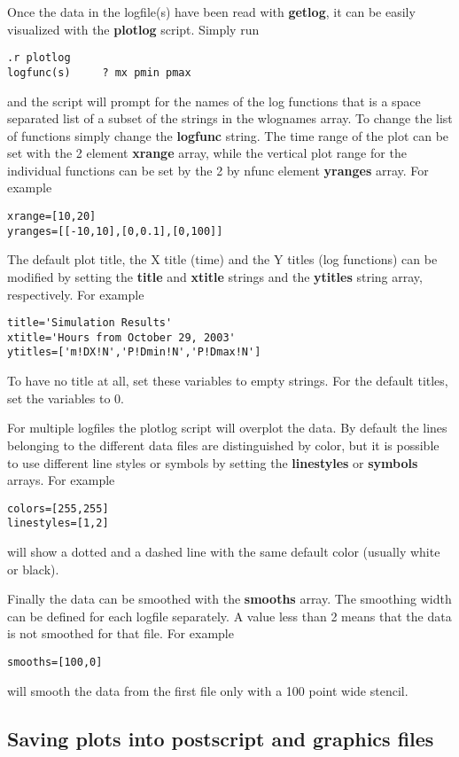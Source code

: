 Once the data in the logfile(s) have been read with {\bf getlog},
it can be easily visualized with the {\bf plotlog} script.
Simply run
\begin{verbatim}
.r plotlog
logfunc(s)     ? mx pmin pmax
\end{verbatim}
and the script will prompt for the names of the log functions that is
a space separated list of a subset of the strings in the wlognames array. 
To change the list of functions simply change the {\bf logfunc} string.
The time range of the plot can be set with the 2 element
{\bf xrange} array, while the vertical plot range for the individual functions 
can be set by the 2 by nfunc element {\bf yranges} array. For example
\begin{verbatim}
xrange=[10,20]
yranges=[[-10,10],[0,0.1],[0,100]]
\end{verbatim}
The default plot title, the X title (time) and the Y titles (log functions)
can be modified by setting the {\bf title} and {\bf xtitle} strings
and the {\bf ytitles} string array, respectively. For example
\begin{verbatim}
title='Simulation Results'
xtitle='Hours from October 29, 2003'
ytitles=['m!DX!N','P!Dmin!N','P!Dmax!N']
\end{verbatim}
To have no title at all, set these variables to empty strings.
For the default titles, set the variables to 0.

For multiple logfiles the plotlog script will overplot the data.
By default the lines belonging to the different data files are distinguished
by color, but it is possible to use different line styles or symbols
by setting the {\bf linestyles} or {\bf symbols} arrays. For example
\begin{verbatim}
colors=[255,255]
linestyles=[1,2]
\end{verbatim}
will show a dotted and a dashed line with the same default color
(usually white or black). 

Finally the data can be smoothed with the {\bf smooths} array. 
The smoothing width can be defined for each logfile separately. 
A value less than 2 means that the data is not smoothed for that file.
For example
\begin{verbatim}
smooths=[100,0]
\end{verbatim}
will smooth the data from the first file only with a 100 point wide stencil.

\subsection{Saving plots into postscript and graphics files 
                \label{s-postscript}}

